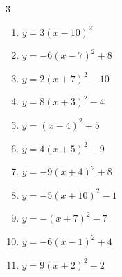 \begin{multicols}{3}
\begin{enumerate}
        \phantom{$\displaystyle 頂点\left( 4 , 7 \right)$}

  \item $\displaystyle y=3\left( x-10\right)^{2}$

        \phantom{$\displaystyle 頂点\left( 10 , 0 \right)$}

  \item $\displaystyle y=-6\left( x-7\right)^{2}+8$

        \phantom{$\displaystyle 頂点\left( 7 , 8 \right)$}

  \item $\displaystyle y=2\left( x+7\right)^{2}-10$

        \phantom{$\displaystyle 頂点\left( -7 , -10 \right)$}

  \item $\displaystyle y=8\left( x+3\right)^{2}-4$

        \phantom{$\displaystyle 頂点\left( -3 , -4 \right)$}

  \item $\displaystyle y=\left( x-4\right)^{2}+5$

        \phantom{$\displaystyle 頂点\left( 4 , 5 \right)$}

  \item $\displaystyle y=4\left( x+5\right)^{2}-9$

        \phantom{$\displaystyle 頂点\left( -5 , -9 \right)$}

  \item $\displaystyle y=-9\left( x+4\right)^{2}+8$

        \phantom{$\displaystyle 頂点\left( -4 , 8 \right)$}

  \item $\displaystyle y=-5\left( x+10\right)^{2}-1$

        \phantom{$\displaystyle 頂点\left( -10 , -1 \right)$}

  \item $\displaystyle y=-\left( x+7\right)^{2}-7$

        \phantom{$\displaystyle 頂点\left( -7 , -7 \right)$}

  \item $\displaystyle y=-6\left( x-1\right)^{2}+4$

        \phantom{$\displaystyle 頂点\left( 1 , 4 \right)$}

  \item $\displaystyle y=9\left( x+2\right)^{2}-2$

        \phantom{$\displaystyle 頂点\left( -2 , -2 \right)$}


\end{enumerate}
\end{multicols}
